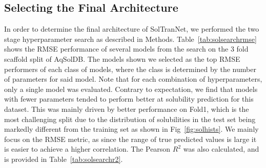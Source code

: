 \documentclass[journal=jmcmar,manuscript=article]{achemso}
\begin{document}
\subsection{Selecting the Final Architecture}

In order to determine the final architecture of SolTranNet, we performed the two stage hyperparameter search as described in Methods.
Table~\ref{tab:solsearchrmse} shows the RMSE performance of several models from the search on the 3 fold scaffold split of AqSolDB.
The models shown we selected as the top RMSE performers of each class of models, where the class is determined by the number of parameters for said model.
Note that for each combination of hyperparameters, only a single model was evaluated.
Contrary to expectation, we find that models with fewer parameters tended to perform better at solubility prediction for this dataset.
This was mainly driven by better performance on Fold1, which is the most challenging split due to the distribution of solubilities in the test set being markedly different from the training set as shown in Fig~\ref{fig:solhists}.
We mainly focus on the RMSE metric, as since the range of true predicted values is large it is easier to achieve a higher correlation.
The Pearson $R^2$ was also calculated, and is provided in Table~\ref{tab:solsearchr2}.
\end{document}

